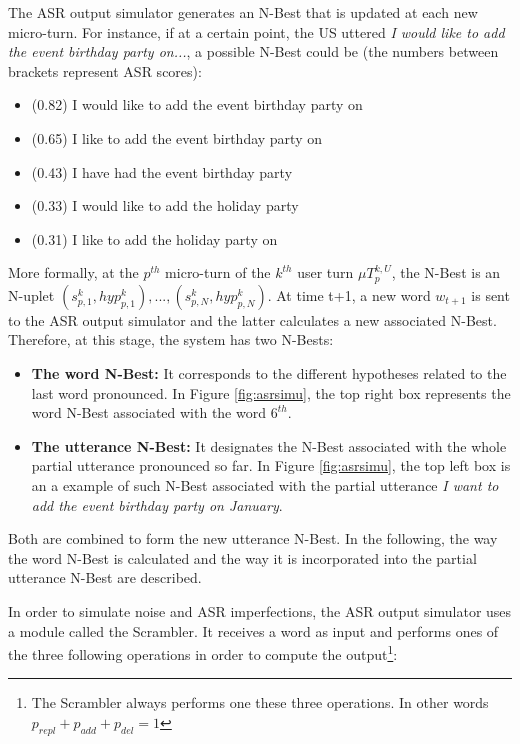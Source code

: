 				The ASR output simulator generates an N-Best that is updated at each new micro-turn. For instance, if at a certain point, the US uttered \textit{I would like to add the event birthday party on...}, a possible N-Best could be (the numbers between brackets represent ASR scores):
					
					\begin{itemize}
						\item (0.82) I would like to add the event birthday party on
						\item (0.65) I like to add the event birthday party on
						\item (0.43) I have had the event birthday party
						\item (0.33) I would like to add the holiday party
						\item (0.31) I like to add the holiday party on
					\end{itemize}
					
					More formally, at the $p^{th}$ micro-turn of the $k^{th}$ user turn $\mu T^{k,U}_p$, the N-Best is an N-uplet ${(s^k_{p,1}, hyp^k_{p,1}),...,(s^k_{p,N}, hyp^k_{p,N})}$. At time t+1, a new word $w_{t+1}$ is sent to the ASR output simulator and the latter calculates a new associated N-Best. Therefore, at this stage, the system has two N-Bests:
					
					\begin{itemize}
						\item \textbf{The word N-Best:} It corresponds to the different hypotheses related to the last word pronounced. In Figure \ref{fig:asrsimu}, the top right box represents the word N-Best associated with the word $6^{th}$.
						\item \textbf{The utterance N-Best:} It designates the N-Best associated with the whole partial utterance pronounced so far. In Figure \ref{fig:asrsimu}, the top left box is an a example of such N-Best associated with the partial utterance \textit{I want to add the event birthday party on January}.
					\end{itemize}
					
					Both are combined to form the new utterance N-Best. In the following, the way the word N-Best is calculated and the way it is incorporated into the partial utterance N-Best are described.
					
					In order to simulate noise and ASR imperfections, the ASR output simulator uses a module called the Scrambler. It receives a word as input and performs ones of the three following operations in order to compute the output\footnote{The Scrambler always performs one these three operations. In other words $p_{repl} + p_{add} + p_{del} = 1$}:
					
